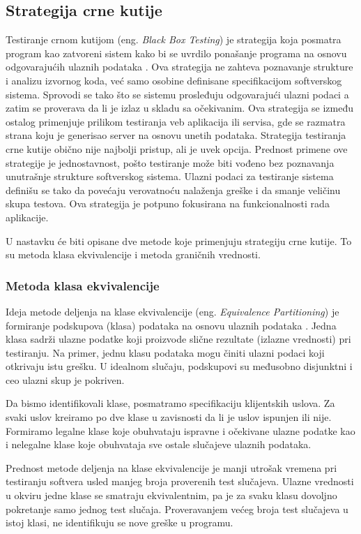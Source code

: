 \documentclass[12pt,oneside]{memoir}
\begin{document}
\subsection{Strategija crne kutije}
Testiranje crnom kutijom (eng. \textit{Black Box Testing}) je strategija koja posmatra program kao zatvoreni sistem kako bi se uvrdilo ponašanje programa na
osnovu odgovarajućih ulaznih podataka \cite{BlackBoxTesting}. Ova strategija ne zahteva poznavanje strukture i analizu izvornog
koda, već samo osobine definisane specifikacijom softverskog sistema. Sprovodi se tako što se sistemu prosleđuju odgovarajući ulazni podaci a zatim se proverava da li je izlaz u skladu sa očekivanim. 
Ova strategija se između ostalog primenjuje prilikom testiranja veb aplikacija ili servisa, gde se razmatra strana koju je generisao server na osnovu unetih podataka. Strategija testiranja crne kutije obično nije najbolji pristup, ali je uvek opcija. Prednost primene ove strategije je jednostavnost, pošto testiranje može biti vođeno bez poznavanja unutrašnje
strukture softverskog sistema. Ulazni podaci za testiranje sistema definišu se tako
da povećaju verovatnoću nalaženja greške i da smanje veličinu skupa testova. Ova strategija je potpuno fokusirana na funkcionalnosti rada aplikacije. \par
U nastavku će biti opisane dve metode koje primenjuju strategiju crne kutije. To su metoda klasa ekvivalencije i metoda graničnih vrednosti.
\par 
\subsubsection{Metoda klasa ekvivalencije}
Ideja metode deljenja na klase ekvivalencije (eng. \textit{Equivalence Partitioning}) je formiranje podskupova (klasa) podataka na osnovu ulaznih podataka \cite{PartitioningBoundary}. Jedna klasa sadrži ulazne podatke koji proizvode slične rezultate (izlazne vrednosti) pri testiranju. Na primer, jednu klasu podataka mogu činiti ulazni podaci koji otkrivaju istu grešku. U idealnom slučaju, podskupovi su međusobno disjunktni i ceo ulazni skup je pokriven. 
\par 
Da bismo identifikovali klase, posmatramo specifikaciju klijentskih uslova.
Za svaki uslov kreiramo po dve klase u zavisnosti da li je uslov ispunjen ili nije. Formiramo legalne klase koje obuhvataju ispravne i očekivane ulazne podatke kao i nelegalne klase koje obuhvataja sve ostale slučajeve ulaznih podataka.
\par 
Prednost metode deljenja na klase ekvivalencije je manji utrošak vremena pri testiranju softvera usled manjeg broja proverenih test slučajeva. Ulazne vrednosti u okviru jedne klase se smatraju ekvivalentnim, pa je za svaku klasu dovoljno pokretanje samo jednog test slučaja. Proveravanjem većeg broja test slučajeva u istoj klasi, ne identifikuju se nove greške u programu.
\end{document}
